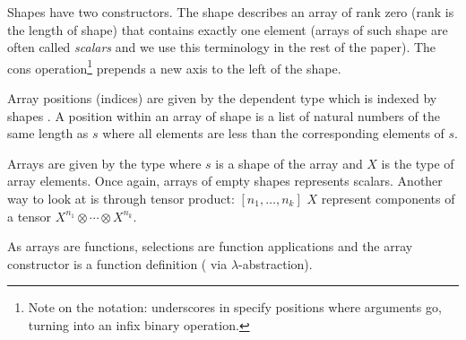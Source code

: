 
Shapes  have two constructors. The \AC{[]} shape describes an array of
rank zero (rank is the length of shape) that contains exactly one
element (arrays of such shape are often called \emph{scalars} and we use this
terminology in the rest of the paper).
The cons operation\footnote{
Note on the notation: underscores in  specify positions where
arguments go, turning  into an infix binary operation.}%
 prepends a new axis to the left of the shape.

Array positions (indices) are given by the dependent type  which
is indexed by shapes .  A position within an array of shape 
is a list of natural numbers of the same length as $s$ where all elements
are less than the corresponding elements of $s$.

Arrays are given by the type    where $s$ is a shape of the
array and $X$ is the type of array elements. Once again, arrays of empty shapes
represents scalars.  Another way to look at  is through tensor product:
 $[n_1, \dots, n_k]$ $X$ represent components of a tensor $X^{n_1} \otimes
\cdots \otimes X^{n_k}$.

As arrays are functions, selections are function applications and
the array constructor is a function definition (\eg{} via $\lambda$-abstraction).


